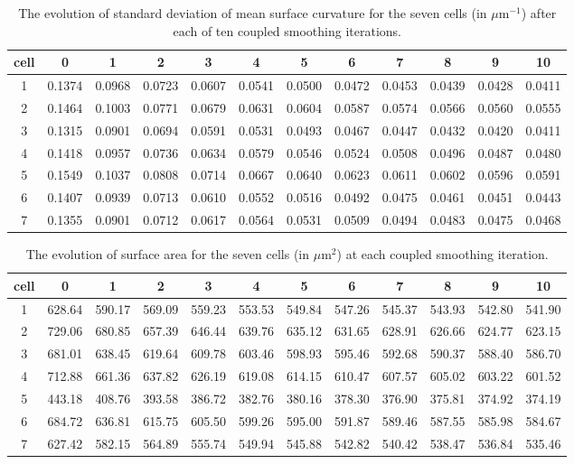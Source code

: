 \documentclass[a4paper,10pt]{article}
\begin{document}
\begin{table}[H]
\begin{center}
\footnotesize
\begin{tabular}{|c|ccccccccccc|}
\hline
cell & 0 &1 &2 &3 &4 &5 &6 &7 &8 &9 &10\\
\hline
1 &0.1374 &0.0968 &0.0723 &0.0607 &0.0541 &0.0500 &0.0472 &0.0453 &0.0439 &0.0428 &0.0411\\
2 &0.1464 &0.1003 &0.0771 &0.0679 &0.0631 &0.0604 &0.0587 &0.0574 &0.0566 &0.0560 &0.0555\\
3 &0.1315 &0.0901 &0.0694 &0.0591 &0.0531 &0.0493 &0.0467 &0.0447 &0.0432 &0.0420 &0.0411\\
4 &0.1418 &0.0957 &0.0736 &0.0634 &0.0579 &0.0546 &0.0524 &0.0508 &0.0496 &0.0487 &0.0480\\
5 &0.1549 &0.1037 &0.0808 &0.0714 &0.0667 &0.0640 &0.0623 &0.0611 &0.0602 &0.0596 &0.0591\\
6 &0.1407 &0.0939 &0.0713 &0.0610 &0.0552 &0.0516 &0.0492 &0.0475 &0.0461 &0.0451 &0.0443\\
7 &0.1355 &0.0901 &0.0712 &0.0617 &0.0564 &0.0531 &0.0509 &0.0494 &0.0483 &0.0475 &0.0468\\
\hline
\end{tabular}
\end{center}
\caption{The evolution of standard deviation of mean surface curvature for the seven cells (in $\mu \text{m}^{-1}$)  after each of ten coupled smoothing iterations.}
\label{tab:curv}
\end{table}

\begin{table}[H]
\begin{center}
\footnotesize
\begin{tabular}{|c|ccccccccccc|}
\hline
cell & 0 &1 &2 &3 &4 &5 &6 &7 &8 &9 &10\\
\hline
1 &628.64 &590.17 &569.09 &559.23 &553.53 &549.84 &547.26 &545.37 &543.93 &542.80 &541.90\\
2 &729.06 &680.85 &657.39 &646.44 &639.76 &635.12 &631.65 &628.91 &626.66 &624.77 &623.15\\
3 &681.01 &638.45 &619.64 &609.78 &603.46 &598.93 &595.46 &592.68 &590.37 &588.40 &586.70\\
4 &712.88 &661.36 &637.82 &626.19 &619.08 &614.15 &610.47 &607.57 &605.02 &603.22 &601.52\\
5 &443.18 &408.76 &393.58 &386.72 &382.76 &380.16 &378.30 &376.90 &375.81 &374.92 &374.19\\
6 &684.72 &636.81 &615.75 &605.50 &599.26 &595.00 &591.87 &589.46 &587.55 &585.98 &584.67\\
7 &627.42 &582.15 &564.89 &555.74 &549.94 &545.88 &542.82 &540.42 &538.47 &536.84 &535.46\\
\hline
\end{tabular}
\end{center}
\caption{The evolution of surface area for the seven cells (in $\mu \text{m}^2$)  at each coupled smoothing iteration.}
\label{tab:surf}
\end{table}
\end{document}

